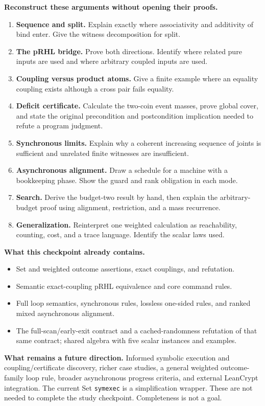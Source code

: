 \documentclass[11pt,a4paper]{article}
\begin{document}
\textbf{Reconstruct these arguments without opening their proofs.}
\begin{enumerate}[itemsep=7pt]
 \item \textbf{Sequence and split.} Explain exactly where associativity and
 additivity of bind enter. Give the witness decomposition for split.
 \item \textbf{The pRHL bridge.} Prove both directions. Identify where related
 pure inputs are used and where arbitrary coupled inputs are used.
 \item \textbf{Coupling versus product atoms.} Give a finite example where an
 equality coupling exists although a cross pair fails equality.
 \item \textbf{Deficit certificate.} Calculate the two-coin event masses,
 prove global cover, and state the original precondition and postcondition
 implication needed to refute a program judgment.
 \item \textbf{Synchronous limits.} Explain why a coherent increasing sequence
 of joints is sufficient and unrelated finite witnesses are insufficient.
 \item \textbf{Asynchronous alignment.} Draw a schedule for a machine with a
 bookkeeping phase. Show the guard and rank obligation in each mode.
 \item \textbf{Search.} Derive the budget-two result by hand, then explain the
 arbitrary-budget proof using alignment, restriction, and a mass recurrence.
 \item \textbf{Generalization.} Reinterpret one weighted calculation as
 reachability, counting, cost, and a trace language. Identify the scalar laws used.
\end{enumerate}

\bigskip
\textbf{What this checkpoint already contains.}
\begin{itemize}[itemsep=3pt]
 \item Set and weighted outcome assertions, exact couplings, and refutation.
 \item Semantic exact-coupling pRHL equivalence and core command rules.
 \item Full loop semantics, synchronous rules, lossless one-sided rules, and
 ranked mixed asynchronous alignment.
 \item The full-scan/early-exit contract and a cached-randomness refutation of
 that same contract; shared algebra with five scalar instances and examples.
\end{itemize}

\bigskip
\textbf{What remains a future direction.} Informed symbolic execution and
coupling/certificate discovery, richer case studies, a general weighted
outcome-family loop rule, broader asynchronous progress criteria, and external
LeanCrypt integration. The current Set \texttt{symexec} is a simplification wrapper.
These are not needed to complete the study checkpoint. Completeness is not a goal.
\end{document}
